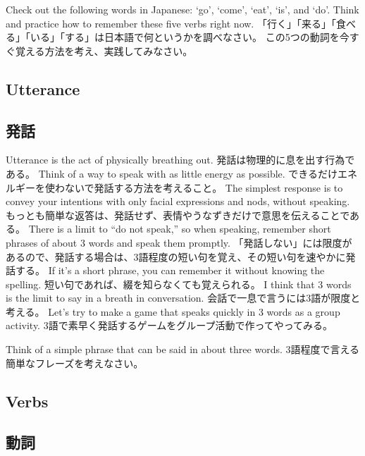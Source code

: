 \documentclass[uplatex,dvipdfmx,b5paper,english,10pt]{jsbook}
\begin{document}
\begin{toiquestion}
\ifEnglish
Check out the following words in Japanese: `go', `come', `eat', `is', and `do'.
Think and practice how to remember these five verbs right now.
\else
「行く」「来る」「食べる」「いる」「する」は日本語で何というかを調べなさい。
この5つの動詞を今すぐ覚える方法を考え、実践してみなさい。
\fi
\end{toiquestion}


\ifEnglish
\subsection{Utterance}
\else
\subsection{発話}
\fi

\ifEnglish
Utterance is the act of physically breathing out.
\else
発話は物理的に息を出す行為である。
\fi
\ifEnglish
Think of a way to speak with as little energy as possible.
\else
できるだけエネルギーを使わないで発話する方法を考えること。
\fi
\ifEnglish
The simplest response is to convey your intentions with only facial expressions and nods, without speaking.
\else
もっとも簡単な返答は、発話せず、表情やうなずきだけで意思を伝えることである。
\fi
\ifEnglish
There is a limit to ``do not speak,'' so when speaking, remember short phrases of about 3 words and speak them promptly.
\else
「発話しない」には限度があるので、発話する場合は、3語程度の短い句を覚え、その短い句を速やかに発話する。
\fi
\ifEnglish
If it's a short phrase, you can remember it without knowing the spelling.
\else
短い句であれば、綴を知らなくても覚えられる。
\fi
\ifEnglish
I think that 3 words is the limit to say in a breath in conversation.
\else
会話で一息で言うには3語が限度と考える。
\fi
\ifEnglish
Let's try to make a game that speaks quickly in 3 words as a group activity.
\else
3語で素早く発話するゲームをグループ活動で作ってやってみる。
\fi

\begin{toiquestion}
\ifEnglish
Think of a simple phrase that can be said in about three words.
\else
3語程度で言える簡単なフレーズを考えなさい。
\fi
\end{toiquestion}


\ifEnglish
\subsection{Verbs}
\else
\subsection{動詞}
\fi
\end{document}
